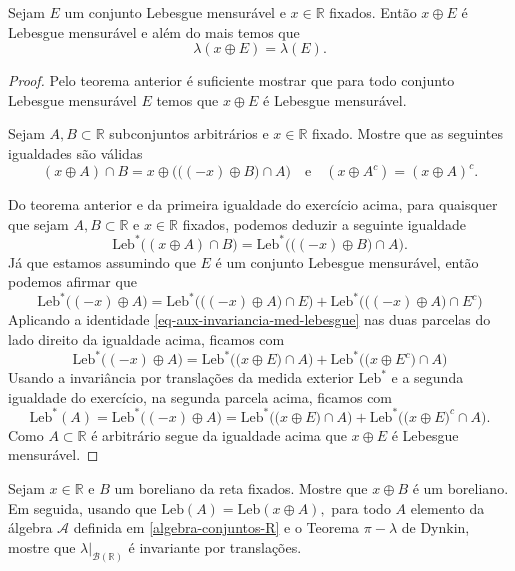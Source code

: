 \begin{teorema}
Sejam $E$ um conjunto Lebesgue mensurável e $x\in\mathbb{R}$
fixados. Então $x\oplus E$ é Lebesgue mensurável e além do 
mais temos que 
\[
\lambda(x\oplus E)= \lambda(E).
\]
\end{teorema}

\begin{proof}
Pelo teorema anterior é suficiente mostrar que 
para todo conjunto Lebesgue mensurável $E$ temos 
que $x\oplus E$ é Lebesgue mensurável.
\begin{exercicio}
Sejam $A,B\subset \mathbb{R}$ subconjuntos arbitrários
e $x\in\mathbb{R}$ fixado. Mostre que as seguintes igualdades
são válidas
\[
(x\oplus A)\cap B 
= 
x\oplus 
\Big( \big((-x)\oplus B\big) \cap A  \Big)
\quad\text{e}\quad
(x\oplus A^c) = (x\oplus A)^c.
\]
\end{exercicio}
Do teorema anterior e da primeira igualdade do exercício 
acima, para quaisquer que sejam $A,B\subset \mathbb{R}$ 
e $x\in\mathbb{R}$ fixados, podemos deduzir a seguinte igualdade  
\begin{equation}\label{eq-aux-invariancia-med-lebesgue}
\mathrm{Leb}^*\big((x\oplus A)\cap B\big)
= 
\mathrm{Leb}^*
\Big(\big((-x)\oplus B\big) \cap A \Big).
\end{equation}
Já que estamos assumindo que $E$ 
é um conjunto Lebesgue mensurável, então 
podemos afirmar que 
\[
\mathrm{Leb}^*\big((-x)\oplus A\big)
=
\mathrm{Leb}^*\Big( \big((-x)\oplus A\big) \cap E\Big)
+
\mathrm{Leb}^*\Big( \big((-x)\oplus A\big) \cap E^c\Big)
\]
Aplicando a identidade 
\eqref{eq-aux-invariancia-med-lebesgue} nas duas parcelas
do lado direito da igualdade acima, ficamos com 
\[
\mathrm{Leb}^*\big((-x)\oplus A\big)
=
\mathrm{Leb}^*\Big( \big(x\oplus E\big) \cap A\Big)
+
\mathrm{Leb}^*\Big( \big(x\oplus E^c\big) \cap A\Big)
\]
Usando a invariância por translações da medida exterior 
$\mathrm{Leb}^*$ e a segunda igualdade do exercício,
na segunda parcela acima, ficamos com 
\[
\mathrm{Leb}^*(A)
=
\mathrm{Leb}^*\big((-x)\oplus A\big)
=
\mathrm{Leb}^*\Big( \big(x\oplus E\big) \cap A\Big)
+
\mathrm{Leb}^*\Big( \big(x\oplus E\big)^c \cap A\Big).
\]
Como $A\subset \mathbb{R}$ é arbitrário segue da igualdade acima que 
$x\oplus E$ é Lebesgue mensurável.
\end{proof}







\begin{exercicio}
Sejam $x\in\mathbb{R}$ e $B$ um boreliano da reta fixados.
Mostre que $x\oplus B$ é um boreliano.
Em seguida, usando que 
$
	\mathrm{Leb}(A)=\mathrm{Leb}(x\oplus A),
$
para todo $A$ elemento da 
álgebra $\mathcal{A}$ definida em \eqref{algebra-conjuntos-R}
e o Teorema $\pi-\lambda$ de Dynkin,
mostre que $\lambda\big|_{\mathscr{B}(\mathbb{R})}$
é invariante por translações. 

\end{exercicio}


